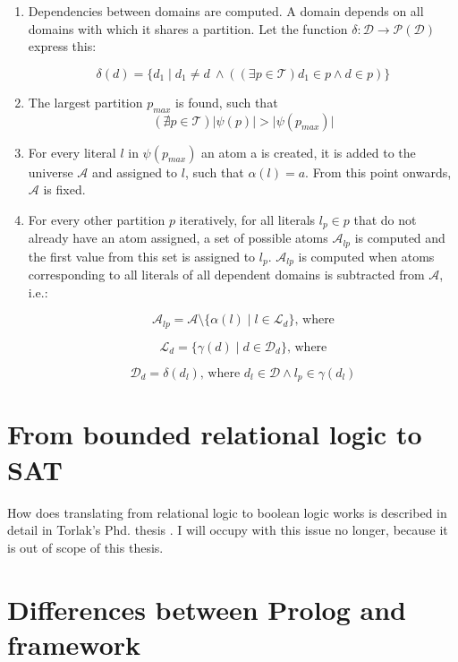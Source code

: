 \documentclass[11pt,twoside,a4paper]{book}
\providecommand{\abs}[1]{\lvert#1\rvert}
\begin{document}
\begin{enumerate}
  \item Dependencies between domains are computed. A domain depends on all
  domains with which it shares a partition. Let the function $\delta :
  \mathcal{D} \rightarrow \mathcal{P}\left(\mathcal{D}\right)$ express this:
  
  $$\delta\left(d\right) = \{d_1 \mid d_1 \neq d\ \wedge
  \left(\left(\exists p \in \mathcal{T}\right)d_1 \in p\wedge d \in p\right)\}
  $$
  \item The largest partition $p_{max}$ is found, such that
  $$\left(\nexists p\in \mathcal{T}\right) \abs{\psi\left(p\right)} >
  \abs{\psi\left(p_{max}\right)}$$
  \item For every literal $l$ in $\psi\left(p_{max}\right)$ an atom a is
  created, it is added to the universe $\mathcal{A}$ and assigned to $l$, such
  that $\alpha\left(l\right) = a$. From this point onwards, $\mathcal{A}$ is fixed.
  \item For every other partition $p$ iteratively, for all literals $l_p \in p$
  that do not already have an atom assigned, a set of possible atoms
  $\mathcal{A}_{lp}$ is computed and the first value from this set is assigned
  to $l_p$. $\mathcal{A}_{lp}$ is computed when atoms corresponding to all literals of all
  dependent domains is subtracted from $\mathcal{A}$, i.e.:
  \newpage
  
  $$\mathcal{A}_{lp} = \mathcal{A} \setminus \{\alpha\left(l\right)\mid
  l\in\mathcal{L}_d\} \text{, where}$$
  
  $$\mathcal{L}_d = \{\gamma\left(d\right)\mid
  d\in\mathcal{D}_d\} \text{, where}$$
  
  $$\mathcal{D}_d = \delta\left(d_l\right) \text{, where } d_l\in\mathcal{D}
  \wedge l_p \in \gamma\left(d_l\right)$$
\end{enumerate}

\section{From bounded relational logic to SAT}
How does translating from relational logic to boolean logic works is described
in detail in Torlak's Phd. thesis \cite{torlak:constraintSolver}. I will
occupy with this issue no longer, because it is out of scope of this thesis.


\section{Differences between Prolog and framework}
\end{document}
